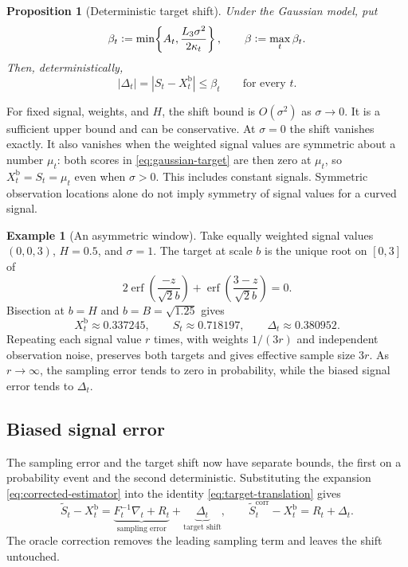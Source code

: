 \documentclass[11pt]{article}
\newcommand{\eqdef}{\mathrel{\vcentcolon=}}
\newcommand{\BiasedSignal}{X^{\mathrm b}}
\newcommand{\IMFs}{S}
\newcommand{\IMFt}{\widetilde S}
\newcommand{\IF}{F}
\newtheorem{proposition}{Proposition}[section]
\theoremstyle{definition}
\newtheorem*{example}{Example}
\begin{document}
\begin{proposition}[Deterministic target shift]\label{prop:shift}
Under the Gaussian model, put
\begin{equation}
  \beta_t\eqdef\min\!\left\{A_t,
                  \frac{L_3\sigma^2}{2\kappa_t}\right\},
  \qquad \beta\eqdef\max_t\beta_t.
  \label{eq:beta}
\end{equation}
Then, deterministically,
\begin{equation}
  |\Delta_t|=|\IMFs_t-\BiasedSignal_t|\leq\beta_t\qquad\text{for every }t.
  \label{eq:target-shift-bound}
\end{equation}
\end{proposition}

For fixed signal, weights, and \(H\), the shift bound is \(O(\sigma^2)\) as
\(\sigma\to0\).  It is a sufficient upper bound and can be conservative.  At
\(\sigma=0\) the shift vanishes exactly.  It also vanishes when the weighted
signal values are symmetric about a number \(\mu_t\): both scores in
\eqref{eq:gaussian-target} are then zero at \(\mu_t\), so
\(\BiasedSignal_t=\IMFs_t=\mu_t\) even when \(\sigma>0\).  This includes
constant signals.  Symmetric observation locations alone do not imply
symmetry of signal values for a curved signal.

\begin{example}[An asymmetric window]
Take equally weighted signal values \((0,0,3)\), \(H=0.5\), and
\(\sigma=1\).  The target at scale \(b\) is the unique root on \([0,3]\) of
\[
  2\operatorname{erf}\!\left(\frac{-z}{\sqrt2b}\right)
  +\operatorname{erf}\!\left(\frac{3-z}{\sqrt2b}\right)=0.
\]
Bisection at \(b=H\) and \(b=B=\sqrt{1.25}\) gives
\[
  \BiasedSignal_t\approx0.337245,\qquad \IMFs_t\approx0.718197,
  \qquad\Delta_t\approx0.380952.
\]
Repeating each signal value \(r\) times, with weights \(1/(3r)\) and
independent observation noise, preserves both targets and gives effective
sample size \(3r\).  As \(r\to\infty\), the sampling error tends to zero in
probability, while the biased signal error tends to \(\Delta_t\).
\end{example}

\subsection{Biased signal error}\label{sec:biased}

The sampling error and the target shift now have separate bounds, the first
on a probability event and the second deterministic.  Substituting the
expansion \eqref{eq:corrected-estimator} into the identity
\eqref{eq:target-translation} gives
\begin{equation}
  \IMFt_t-\BiasedSignal_t
    =\underbrace{\IF_t^{-1}\nabla_t+R_t}_{\text{sampling error}}
     +\underbrace{\Delta_t}_{\text{target shift}},
  \qquad
  \IMFt_t^{\mathrm{corr}}-\BiasedSignal_t=R_t+\Delta_t.
  \label{eq:biased-expansion}
\end{equation}
The oracle correction removes the leading sampling term and leaves the shift
untouched.
\end{document}
